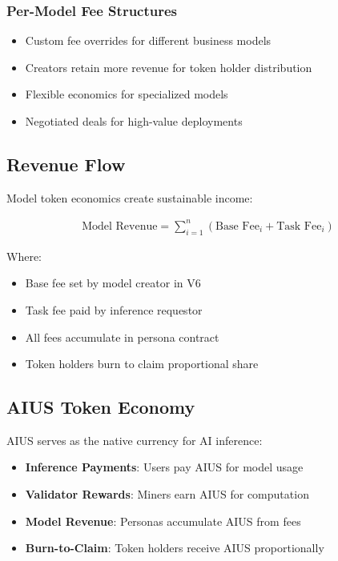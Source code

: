 \documentclass{article}
\begin{document}
\subsubsection{Per-Model Fee Structures}
\begin{itemize}
    \item Custom fee overrides for different business models
    \item Creators retain more revenue for token holder distribution
    \item Flexible economics for specialized models
    \item Negotiated deals for high-value deployments
\end{itemize}

\subsection{Revenue Flow}

Model token economics create sustainable income:

\begin{align}
\text{Model Revenue} = \sum_{i=1}^{n} (\text{Base Fee}_i + \text{Task Fee}_i)
\end{align}

Where:
\begin{itemize}
    \item Base fee set by model creator in V6
    \item Task fee paid by inference requestor
    \item All fees accumulate in persona contract
    \item Token holders burn to claim proportional share
\end{itemize}

\subsection{AIUS Token Economy}

AIUS serves as the native currency for AI inference:

\begin{itemize}
    \item \textbf{Inference Payments}: Users pay AIUS for model usage
    \item \textbf{Validator Rewards}: Miners earn AIUS for computation
    \item \textbf{Model Revenue}: Personas accumulate AIUS from fees
    \item \textbf{Burn-to-Claim}: Token holders receive AIUS proportionally
\end{itemize}
\end{document}
